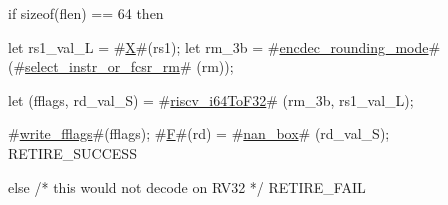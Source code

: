 if   sizeof(flen) == 64
then {
  let rs1_val_L = #\hyperref[sailRISCVzX]{X}#(rs1);
  let rm_3b     = #\hyperref[sailRISCVzencdeczyroundingzymode]{encdec\_rounding\_mode}# (#\hyperref[sailRISCVzselectzyinstrzyorzyfcsrzyrm]{select\_instr\_or\_fcsr\_rm}#  (rm));

  let (fflags, rd_val_S) = #\hyperref[sailRISCVzriscvzyi64ToF32]{riscv\_i64ToF32}# (rm_3b, rs1_val_L);

  #\hyperref[sailRISCVzwritezyfflags]{write\_fflags}#(fflags);
  #\hyperref[sailRISCVzF]{F}#(rd) = #\hyperref[sailRISCVznanzybox]{nan\_box}# (rd_val_S);
  RETIRE_SUCCESS
} else {
  /* this would not decode on RV32 */
  RETIRE_FAIL
}
